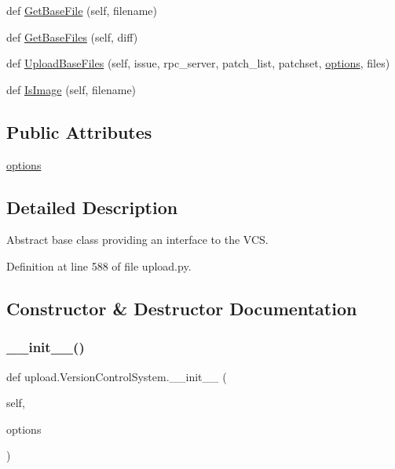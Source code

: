 \begin{DoxyCompactItemize}
def \hyperlink{classupload_1_1VersionControlSystem_adfd9d4ecba422102233a2ba13e5bfaf5}{Get\+Base\+File} (self, filename)
\item 
def \hyperlink{classupload_1_1VersionControlSystem_a812c3b3daf90c88b015fa4b26252e291}{Get\+Base\+Files} (self, diff)
\item 
def \hyperlink{classupload_1_1VersionControlSystem_a7e334f967301b9e85e5a9c39f5036823}{Upload\+Base\+Files} (self, issue, rpc\+\_\+server, patch\+\_\+list, patchset, \hyperlink{classupload_1_1VersionControlSystem_a4d57d043bc408887b94269fe4cea9556}{options}, files)
\item 
def \hyperlink{classupload_1_1VersionControlSystem_a846889ecd2ef40870b456ddb5b349e02}{Is\+Image} (self, filename)
\end{DoxyCompactItemize}
\subsection*{Public Attributes}
\begin{DoxyCompactItemize}
\item 
\hyperlink{classupload_1_1VersionControlSystem_a4d57d043bc408887b94269fe4cea9556}{options}
\end{DoxyCompactItemize}


\subsection{Detailed Description}
\begin{DoxyVerb}Abstract base class providing an interface to the VCS.\end{DoxyVerb}
 

Definition at line 588 of file upload.\+py.



\subsection{Constructor \& Destructor Documentation}
\mbox{\label{classupload_1_1VersionControlSystem_ace97e5785a2b40011404ae6fbb956ecf}} 
\subsubsection{\texorpdfstring{\+\_\+\+\_\+init\+\_\+\+\_\+()}{\_\_init\_\_()}\hspace{0.1cm}{\footnotesize\ttfamily [1/2]}}
{\footnotesize\ttfamily def upload.\+Version\+Control\+System.\+\_\+\+\_\+init\+\_\+\+\_\+ (\begin{DoxyParamCaption}\item[{}]{self,  }\item[{}]{options }\end{DoxyParamCaption})}

